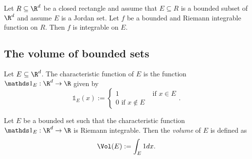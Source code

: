 \begin{proposition}
    Let $R \subseteq \R^d$ be a closed rectangle and assume that $E \subseteq R$ is a bounded
    subset of $\R^d$ and assume $E$ is a Jordan set. Let $f$ be a bounded and Riemann
    integrable function on $R$. Then $f$ is integrable on $E$.
\end{proposition}

\subsection{The volume of bounded sets}
\begin{definition}
    Let $E \subseteq \R^d$. The characteristic function of $E$ is the function 
    $\mathds 1_E:\R^d \to \R$ given by
    $$\mathds 1_E(x) := \begin{cases} 1 &\text{ if } x \in E \\ 0 \text{ if } x \notin E \end{cases}.$$
\end{definition}

\begin{definition}
    Let $E$ be a bounded set such that the characteristic function $\mathds 1_E:\R^d \to \R$ is
    Riemann integrable. Then the \emph{volume} of $E$ is defined as
    $$\Vol(E) := \int_E1dx.$$
\end{definition}
